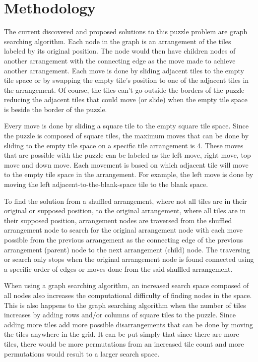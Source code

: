 \section{Methodology}

\par The current discovered and proposed solutions to this puzzle problem are graph searching algorithm. Each node in the graph is an arrangement of the tiles labeled by its original position. The node would then have children nodes of another arrangement with the connecting edge as the move made to achieve another arrangement. Each move is done by sliding adjacent tiles to the empty tile space or by swapping the empty tile's position to one of the adjacent tiles in the arrangement. Of course, the tiles can't go outside the borders of the puzzle reducing the adjacent tiles that could move (or slide) when the empty tile space is beside the border of the puzzle.

\par Every move is done by sliding a square tile to the empty square tile space. Since the puzzle is composed of square tiles, the maximum moves that can be done by sliding to the empty tile space on a specific tile arrangement is 4. These moves that are possible with the puzzle can be labeled as the left move, right move, top move and down move. Each movement is based on which adjacent tile will move to the empty tile space in the arrangement. For example, the left move is done by moving the left adjacent-to-the-blank-space tile to the blank space.

\par To find the solution from a shuffled arrangement, where not all tiles are in their original or supposed position, to the original arrangement, where all tiles are in their supposed position, arrangement nodes are traversed from the shuffled arrangement node to search for the original arrangement node with each move possible from the previous arrangement as the connecting edge of the previous arrangement (parent) node to the next arrangement (child) node. The traversing or search only stops when the original arrangement node is found connected using a specific order of edges or moves done from the said shuffled arrangement.

\par When using a graph searching algorithm, an increased search space composed of all nodes also increases the computational difficulty of finding nodes in the space. This is also happens to the graph searching algorithm when the number of tiles increases by adding rows and/or columns of square tiles to the puzzle. Since adding more tiles add more possible disarrangements that can be done by moving the tiles anywhere in the grid. It can be put simply that since there are more tiles, there would be more permutations from an increased tile count and more permutations would result to a larger search space.

